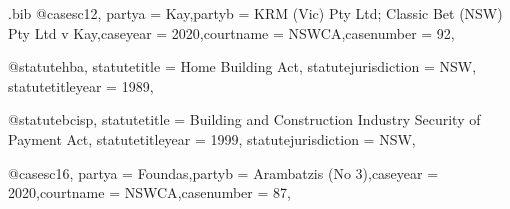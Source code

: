 

\begin{filecontents*}{\jobname.bib}
@case{sc12,
partya = {Kay},partyb = {KRM (Vic) Pty Ltd; Classic Bet (NSW) Pty Ltd v Kay},caseyear = {2020},courtname = {NSWCA},casenumber = {92},}

@statute{hba,
statutetitle = {Home Building Act},
statutejurisdiction = {NSW},
statutetitleyear = {1989},
}

@statute{bcisp,
statutetitle = {Building and Construction Industry Security of Payment Act},
statutetitleyear = {1999},
statutejurisdiction = {NSW},
}

@case{sc16,
partya = {Foundas},partyb = {Arambatzis (No 3)},caseyear = {2020},courtname = {NSWCA},casenumber = {87},}

\end{filecontents*}



\documentclass[12pt]{article}
\newcommand\rulesep{\rule{0.4\textwidth}{.4pt}}
\usepackage[table]{xcolor}
\pagecolor{blue!3}
\usepackage{fontspec}
\setmainfont{Noto Serif}




\newcommand\abibname{lawcite}
\newcommand\abibstyle{style=\abibname}
\usepackage[
	\abibstyle , 
	set-lawcite-indexing=false,
	lawrefstyle=caseallabove,
	show-statute-jurisdiction=true,
	indexing=cite,
	citetracker=true,
	ibidtracker=true,
	pagetracker=true,
	idemtracker=true,
	opcittracker=true,
	loccittracker=true,
	autocite=footnote,
		]{biblatex}





				


\usepackage[
				bookmarks,
            colorlinks=true,        
            allcolors = black,  
            citecolor=blue, 
            hyperindex=false,       
]{hyperref}








